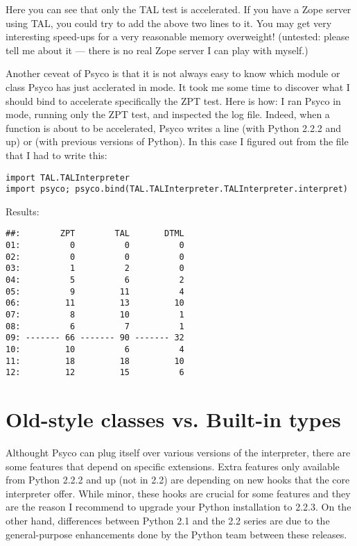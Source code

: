 \documentclass{manual}
\begin{document}
Here you can see that only the TAL test is accelerated.  If you have a Zope server using TAL, you could try to add the above two lines to it.  You may get very interesting speed-ups for a very reasonable memory overweight!  (untested: please tell me about it --- there is no real Zope server I can play with myself.)

Another ceveat of Psyco is that it is not always easy to know which module or class Psyco has just acclerated in  mode.  It took me some time to discover what I should bind to accelerate specifically the ZPT test.  Here is how: I ran Psyco in  mode, running only the ZPT test, and inspected the log file.  Indeed, when a function is about to be accelerated, Psyco writes a line  (with Python 2.2.2 and up) or  (with previous versions of Python).  In this case I figured out from the  file that I had to write this:

\begin{verbatim}
import TAL.TALInterpreter
import psyco; psyco.bind(TAL.TALInterpreter.TALInterpreter.interpret)
\end{verbatim}

Results:

\begin{verbatim}
##:        ZPT        TAL       DTML
01:          0          0          0
02:          0          0          0
03:          1          2          0
04:          5          6          2
05:          9         11          4
06:         11         13         10
07:          8         10          1
08:          6          7          1
09: ------- 66 ------- 90 ------- 32
10:         10          6          4
11:         18         18         10
12:         12         15          6
\end{verbatim}


\section{Old-style classes vs. Built-in types}\label{metaclass}

Althought Psyco can plug itself over various versions of the interpreter, there are some features that depend on specific extensions.  Extra features only available from Python 2.2.2 and up (not in 2.2) are depending on new hooks that the core interpreter offer.  While minor, these hooks are crucial for some features and they are the reason I recommend to upgrade your Python installation to 2.2.3.  On the other hand, differences between Python 2.1 and the 2.2 series are due to the general-purpose enhancements done by the Python team between these releases.
\end{document}

